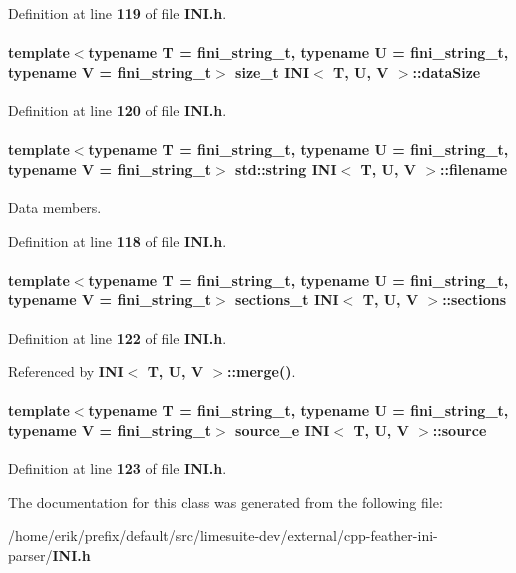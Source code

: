 Definition at line {\bf 119} of file {\bf I\+N\+I.\+h}.

\paragraph[{data\+Size}]{\setlength{\rightskip}{0pt plus 5cm}template$<$typename T  = fini\+\_\+string\+\_\+t, typename U  = fini\+\_\+string\+\_\+t, typename V  = fini\+\_\+string\+\_\+t$>$ size\+\_\+t {\bf I\+NI}$<$ T, U, V $>$\+::data\+Size}\label{classINI_a602d6b20ea275f3e654f1508a95ceea6}


Definition at line {\bf 120} of file {\bf I\+N\+I.\+h}.

\paragraph[{filename}]{\setlength{\rightskip}{0pt plus 5cm}template$<$typename T  = fini\+\_\+string\+\_\+t, typename U  = fini\+\_\+string\+\_\+t, typename V  = fini\+\_\+string\+\_\+t$>$ {\bf std\+::string} {\bf I\+NI}$<$ T, U, V $>$\+::filename}\label{classINI_af52e483d586ea3416df114e70755e96c}


Data members. 



Definition at line {\bf 118} of file {\bf I\+N\+I.\+h}.

\paragraph[{sections}]{\setlength{\rightskip}{0pt plus 5cm}template$<$typename T  = fini\+\_\+string\+\_\+t, typename U  = fini\+\_\+string\+\_\+t, typename V  = fini\+\_\+string\+\_\+t$>$ {\bf sections\+\_\+t} {\bf I\+NI}$<$ T, U, V $>$\+::sections}\label{classINI_ab1825501769c4bb2cdc1d7ddd6a7be7a}


Definition at line {\bf 122} of file {\bf I\+N\+I.\+h}.



Referenced by {\bf I\+N\+I$<$ T, U, V $>$\+::merge()}.

\paragraph[{source}]{\setlength{\rightskip}{0pt plus 5cm}template$<$typename T  = fini\+\_\+string\+\_\+t, typename U  = fini\+\_\+string\+\_\+t, typename V  = fini\+\_\+string\+\_\+t$>$ {\bf source\+\_\+e} {\bf I\+NI}$<$ T, U, V $>$\+::source}\label{classINI_a0a65472be1d0807d6ad380dc0b7b29d3}


Definition at line {\bf 123} of file {\bf I\+N\+I.\+h}.



The documentation for this class was generated from the following file\+:\begin{DoxyCompactItemize}
\item 
/home/erik/prefix/default/src/limesuite-\/dev/external/cpp-\/feather-\/ini-\/parser/{\bf I\+N\+I.\+h}\end{DoxyCompactItemize}
